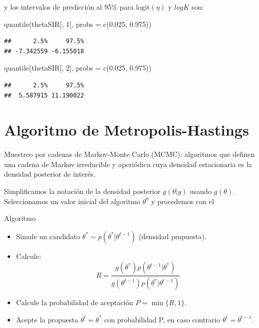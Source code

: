 \documentclass[
  12pt,
]{book}
\newenvironment{Shaded}{\begin{snugshade}}{\end{snugshade}}
\newcommand{\AttributeTok}[1]{\textcolor[rgb]{0.77,0.63,0.00}{#1}}
\newcommand{\DecValTok}[1]{\textcolor[rgb]{0.00,0.00,0.81}{#1}}
\newcommand{\FloatTok}[1]{\textcolor[rgb]{0.00,0.00,0.81}{#1}}
\newcommand{\FunctionTok}[1]{\textcolor[rgb]{0.00,0.00,0.00}{#1}}
\newcommand{\NormalTok}[1]{#1}
\providecommand{\tightlist}{%
  \setlength{\itemsep}{0pt}\setlength{\parskip}{0pt}}
\begin{document}
y los intervalos de predicción al 95\% para \(\text{logit}(\eta)\) y
\(log K\) son:

\begin{Shaded}
\begin{Highlighting}[]
\FunctionTok{quantile}\NormalTok{(thetaSIR[, }\DecValTok{1}\NormalTok{], }\AttributeTok{probs =} \FunctionTok{c}\NormalTok{(}\FloatTok{0.025}\NormalTok{, }\FloatTok{0.975}\NormalTok{))}
\end{Highlighting}
\end{Shaded}

\begin{verbatim}
##      2.5%     97.5% 
## -7.342559 -6.155018
\end{verbatim}

\begin{Shaded}
\begin{Highlighting}[]
\FunctionTok{quantile}\NormalTok{(thetaSIR[, }\DecValTok{2}\NormalTok{], }\AttributeTok{probs =} \FunctionTok{c}\NormalTok{(}\FloatTok{0.025}\NormalTok{, }\FloatTok{0.975}\NormalTok{))}
\end{Highlighting}
\end{Shaded}

\begin{verbatim}
##      2.5%     97.5% 
##  5.587915 11.190022
\end{verbatim}

\hypertarget{algoritmo-de-metropolis-hastings}{%
\section{Algoritmo de
Metropolis-Hastings}\label{algoritmo-de-metropolis-hastings}}

Muestreo por cadenas de Markov-Monte Carlo (MCMC): algoritmos que
definen una cadena de Markov irreducible y aperiódica cuya densidad
estacionaria es la densidad posterior de interés.

Simplificamos la notación de la densidad posterior \(g(\theta|y)\)
usando \(g(\theta)\). Seleccionamos un valor inicial del algoritmo
\(\theta^0\) y procedemos con el

Algoritmo

\begin{itemize}
\tightlist
\item
  Simule un candidato \(\theta^*\sim p(\theta^*|\theta^{t-1})\)
  (densidad propuesta).
\item
  Calcule:
  \[R=\frac{g(\theta^*)p(\theta^{t-1}|\theta^*)}{g(\theta^{t-1})p(\theta^*|\theta^{t-1})}\]
\item
  Calcule la probabilidad de aceptación \(P=\min \{R,1\}\).
\item
  Acepte la propuesta \(\theta^{t}=\theta^*\) con probabilidad P, en
  caso contrario \(\theta^t=\theta^{t-1}\).
\end{itemize}
\end{document}
